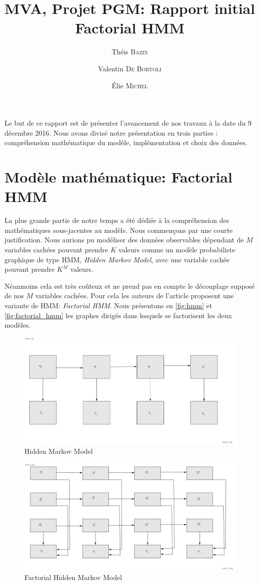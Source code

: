 \documentclass[10pt,a4paper]{article}
\title{MVA, Projet PGM: Rapport initial\\
  Factorial HMM}
\author{Théis \textsc{Bazin} \and Valentin \textsc{De Bortoli} \and Élie \textsc{Michel}}
\newcommand{\hmm}{\textsc{HMM}}
\begin{document}
\maketitle

Le but de ce rapport est de présenter l'avancement de nos travaux à la date du
9 décembre 2016.
Nous avons divisé notre présentation en trois parties : compréhension
mathématique du modèle, implémentation et choix des données.

\section{Modèle mathématique: Factorial HMM}

La plus grande partie de notre temps a été dédiée à la compréhension des
mathématiques sous-jacentes au modèle.
Nous commençons par une courte justification. Nous aurions pu modéliser des
données observables dépendant de $M$ variables cachées pouvant prendre $K$
valeurs comme un modèle probabiliste graphique de type \hmm,
\emph{Hidden Markov Model}, avec une variable cachée pouvant prendre
$K^M$ valeurs.

Néanmoins cela est très coûteux et ne prend pas en compte le découplage supposé
de nos $M$ variables cachées.
Pour cela les auteurs de l'article proposent une variante de \hmm :
\emph{Factorial HMM}.
Nous présentons en \autoref{fig:hmm} et \autoref{fig:factorial_hmm} les graphes
dirigés dans lesquels se factorisent les deux modèles.

\begin{figure}[hpbt]
  \centering
    \includegraphics[scale=0.6]{hmm.png}
  \caption{Hidden Markov Model\label{fig:hmm}}
\end{figure}

\begin{figure}[hpbt]
  \centering
    \includegraphics[scale=0.7]{facthmm.png}
  \caption{Factorial Hidden Markov Model\label{fig:factorial_hmm}}
\end{figure}
\end{document}
